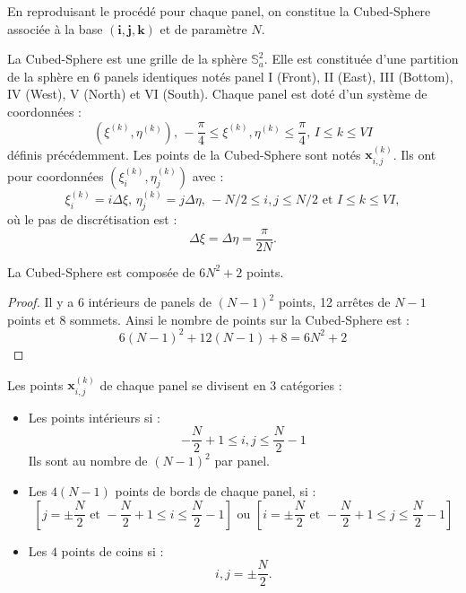 En reproduisant le procédé pour chaque panel, on constitue la Cubed-Sphere associée à la base $(\mathbf{i},\mathbf{j},\mathbf{k})$ et de paramètre $N$.

\begin{definition}
La Cubed-Sphere est une grille de la sphère $\mathbb{S}_a^2$. Elle est constituée d'une partition de la sphère en 6 panels identiques notés panel I (Front), II (East), III (Bottom), IV (West), V (North) et VI (South). Chaque panel est doté d'un système de coordonnées :
\begin{equation}
\left( \xi^{(k)}, \eta^{(k)} \right) \text{, } -\dfrac{\pi}{4} \leq \xi^{(k)}, \eta^{(k)} \leq \dfrac{\pi}{4} \text{, } I \leq k \leq VI
\end{equation}
définis précédemment. Les points de la Cubed-Sphere sont notés $\mathbf{x}_{i,j}^{(k)}$. Ils ont pour coordonnées $\left( \xi_i^{(k)}, \eta_j^{(k)}  \right)$ avec :
\begin{equation}
\xi_i^{(k)} = i \Delta \xi \text{, } \eta_j^{(k)} = j \Delta \eta \text{, } -N/2 \leq i, j \leq N/2 \text{ et } I \leq k \leq VI,
\end{equation}
où le pas de discrétisation est :
\begin{equation}
\Delta \xi = \Delta \eta = \dfrac{\pi}{2 N}.
\end{equation}
\end{definition}

\begin{proposition}
La Cubed-Sphere est composée de $6N^2 +2$ points.
\end{proposition}

\begin{proof}
Il y a 6 intérieurs de panels de $(N-1)^2$ points, 12 arrêtes de $N-1$ points et 8 sommets. Ainsi le nombre de points sur la Cubed-Sphere est :
$$
6 (N-1)^2 + 12 (N-1)+8=6N^2+2
$$
\end{proof}

Les points $\mathbf{x}_{i,j}^{(k)}$ de chaque panel se divisent en 3 catégories :
\begin{itemize}
\item Les points intérieurs si :
\begin{equation}
- \dfrac{N}{2}+1 \leq i,j \leq \dfrac{N}{2}-1
\end{equation}
Ils sont au nombre de $(N-1)^2$ par panel.
\item Les $4(N-1)$ points de bords de chaque panel, si :
\begin{equation}
\left[ j=\pm \dfrac{N}{2} \text{ et } - \dfrac{N}{2}+1 \leq i \leq \dfrac{N}{2}-1 \right] \text{ ou } \left[ i=\pm \dfrac{N}{2} \text{ et } - \dfrac{N}{2}+1 \leq j \leq \dfrac{N}{2}-1 \right]
\end{equation}
\item Les $4$ points de coins si :
\begin{equation}
i, j = \pm \dfrac{N}{2}.
\end{equation}
\end{itemize}



